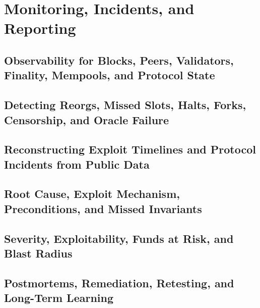 \chapter{Monitoring, Incidents, and Reporting}

\section{Observability for Blocks, Peers, Validators, Finality, Mempools, and Protocol State}

\section{Detecting Reorgs, Missed Slots, Halts, Forks, Censorship, and Oracle Failure}

\section{Reconstructing Exploit Timelines and Protocol Incidents from Public Data}

\section{Root Cause, Exploit Mechanism, Preconditions, and Missed Invariants}

\section{Severity, Exploitability, Funds at Risk, and Blast Radius}

\section{Postmortems, Remediation, Retesting, and Long-Term Learning}
